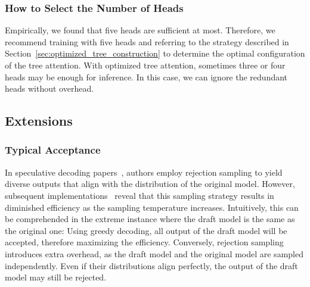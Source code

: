 \subsubsection{How to Select the Number of Heads}
Empirically, we found that five heads are sufficient at most. Therefore, we recommend training with five heads and referring to the strategy described in Section~\ref{sec:optimized_tree_construction} to determine the optimal configuration of the tree attention. With optimized tree attention, sometimes three or four heads may be enough for inference. In this case, we can ignore the redundant heads without overhead.

\subsection{Extensions}
\subsubsection{Typical Acceptance}
\label{sec:typical_acceptance}
In speculative decoding papers~\citep{leviathan2022fast,chen2023accelerating}, authors employ rejection sampling to yield diverse outputs that align with the distribution of the original model. However, subsequent implementations~\citep{gante2023assisted,spector2023accelerating} reveal that this sampling strategy results in diminished efficiency as the sampling temperature increases. Intuitively, this can be comprehended in the extreme instance where the draft model is the same as the original one\textcolor{black}{:} 
Using greedy decoding, all output of the draft model will be accepted, therefore maximizing the efficiency. 
Conversely, rejection sampling introduces extra overhead, as the draft model and the original model are sampled independently. Even if their distributions align perfectly, the output of the draft model may still be rejected.

